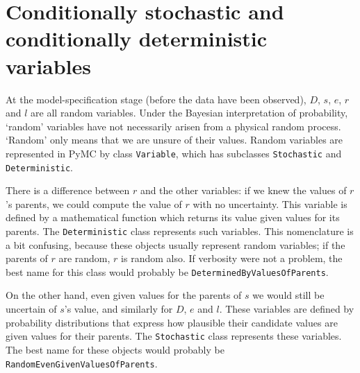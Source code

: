 \section*{Conditionally stochastic and conditionally deterministic variables}

At the model-specification stage (before the data have been observed), $D$, $s$, $e$, $r$ and $l$ are all random variables. Under the Bayesian interpretation of probability, `random' variables have not necessarily arisen from a physical random process. `Random' only means that we are unsure of their values. Random variables are represented in PyMC by class \texttt{Variable}, which has subclasses \texttt{Stochastic} and \texttt{Deterministic}.

There is a difference between $r$ and the other variables: if we knew the values of $r$'s parents, we could compute the value of $r$ with no uncertainty. This variable is defined by a mathematical function which returns its value given values for its parents. The \texttt{Deterministic} class represents such variables. This nomenclature is a bit confusing, because these objects usually represent random variables; if the parents of $r$ are random, $r$ is random also. If verbosity were not a problem, the best name for this class would probably be \texttt{DeterminedByValuesOfParents}.

On the other hand, even given values for the parents of $s$ we would still be uncertain of $s$'s value, and similarly for $D$, $e$ and $l$. These variables are defined by probability distributions that express how plausible their candidate values are given values for their parents. The \texttt{Stochastic} class represents these variables. The best name for these objects would probably be \texttt{RandomEvenGivenValuesOfParents}.

